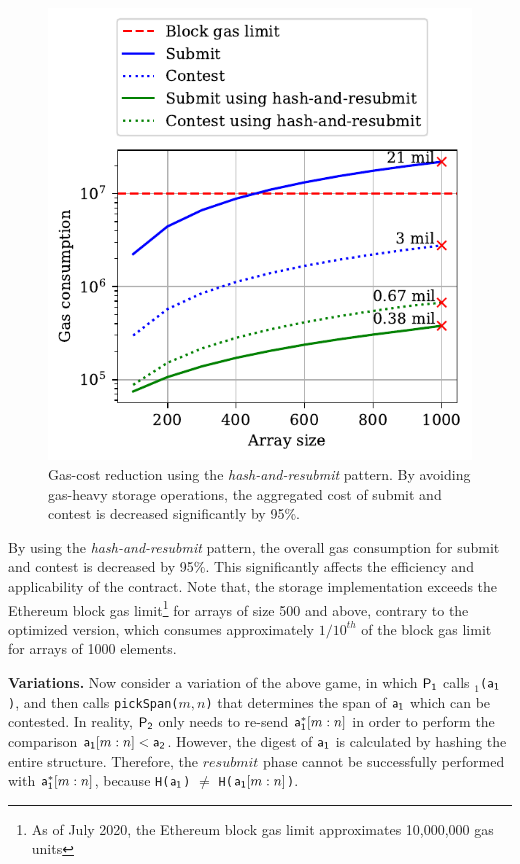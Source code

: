 \begin{figure}[h!]
\begin{center}
\includegraphics[width=1 \columnwidth]{figures/har-example.pdf}
\end{center}
\caption{Gas-cost reduction using the \emph{hash-and-resubmit} pattern. By
    avoiding gas-heavy storage operations, the aggregated cost of
    \textsf{submit} and \textsf{contest} is decreased significantly by 95\%.}
\label{fig:har-example}
\end{figure}

By using the \emph{hash-and-resubmit} pattern, the overall gas consumption for
\textsf{submit} and \textsf{contest} is decreased by 95\%. This
significantly affects the efficiency and applicability of the contract. Note
that, the storage implementation exceeds the Ethereum block gas
limit\footnote{As of July 2020, the Ethereum block gas limit approximates
10,000,000 gas units} for arrays of size 500 and above, contrary to the
optimized version, which consumes approximately $1/10^{th}$ of the block gas
limit for arrays of 1000 elements.

\noindent \textbf{Variations.} Now consider a variation of the above game, in
which $\mathsf{P_1}$ calls \texttt{\proc$_1$(}$\mathsf{a_1}$\texttt{)}, and then calls
\texttt{pickSpan(}$m, n$\texttt{)} that determines the span of $\mathsf{a_1}$ which
can be contested. In reality, $\mathsf{P_2}$ only needs to re-send $\mathsf{a_1^*}[m:n]$ in
order to perform the comparison $\mathsf{a_1}[m:n] < \mathsf{a_2}$. However, the digest of
$\mathsf{a_1}$ is calculated by hashing the entire structure. Therefore, the
$resubmit$ phase cannot be successfully performed with $\mathsf{a_1^*}[m:n]$, because
\texttt{H(}$\mathsf{a_1}$\texttt{)} $\ne$ \texttt{H(}$\mathsf{a_1}[m:n]$\texttt{)}.

